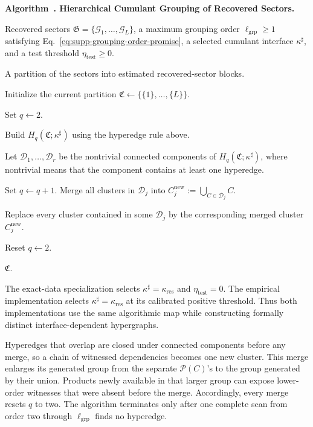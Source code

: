 \documentclass[
  aps,
  prx,
  reprint,
  superscriptaddress,
  amsmath,
  amssymb,
  nofootinbib,
  longbibliography
]{revtex4-2}
\newenvironment{inlinealgorithm}[2]{%
  \par\medskip
  \refstepcounter{figure}%
  \label{#1}%
  \noindent\textbf{Algorithm~\thefigure. #2.}%
  \par\smallskip
}{%
  \par\medskip
}
\begin{document}
\begin{inlinealgorithm}{alg:supp-hierarchical-cumulant-grouping}{Hierarchical Cumulant Grouping of Recovered Sectors}
\begin{algorithmic}[1]
\Require
Recovered sectors $\mathfrak G=\{\mathcal G_1,\dots,\mathcal G_L\}$,
a maximum grouping order $\ell_{\mathrm{grp}}\ge1$ satisfying
Eq.~\eqref{eq:supp-grouping-order-promise}, a selected cumulant interface
$\kappa^\sharp$, and a test threshold $\eta_{\mathrm{test}}\ge0$.

\Ensure
A partition of the sectors into estimated recovered-sector blocks.

\State Initialize the current partition $\mathfrak C\gets \{\{1\},\dots,\{L\}\}$.

\State Set $q\gets 2$.

    \State Build $H_q(\mathfrak C;\kappa^\sharp)$ using the hyperedge rule above.

    \State Let $\mathcal D_1,\dots,\mathcal D_r$ be the nontrivial connected components of $H_q(\mathfrak C;\kappa^\sharp)$, where nontrivial means that the component contains at least one hyperedge.

        \State Set $q\gets q+1$.
    \Else
            \State Merge all clusters in $\mathcal D_j$ into
            $C_j^{\mathrm{new}}:=\bigcup_{C\in\mathcal D_j} C$.
        \EndFor

        \State Replace every cluster contained in some $\mathcal D_j$ by the corresponding merged cluster $C_j^{\mathrm{new}}$.

        \State Reset $q\gets 2$.
    \EndIf
\EndWhile

\State \Return $\mathfrak C$.
\end{algorithmic}
\end{inlinealgorithm}

The exact-data specialization selects
$\kappa^\sharp=\kappa_{\mathrm{res}}$ and
$\eta_{\mathrm{test}}=0$.  The empirical implementation selects
$\kappa^\sharp=\widehat\kappa_{\mathrm{res}}$ at its calibrated positive
threshold.  Thus both implementations use the same algorithmic map while
constructing formally distinct interface-dependent hypergraphs.

Hyperedges that overlap are closed under connected components before any
merge, so a chain of witnessed dependencies becomes one new cluster.  This
merge enlarges its generated group from the separate $\mathcal P(C)$'s to
the group generated by their union.  Products newly available in that larger
group can expose lower-order witnesses that were absent before the merge.
Accordingly, every merge resets $q$ to two.  The algorithm terminates only
after one complete scan from order two through $\ell_{\mathrm{grp}}$ finds no
hyperedge.
\end{document}
